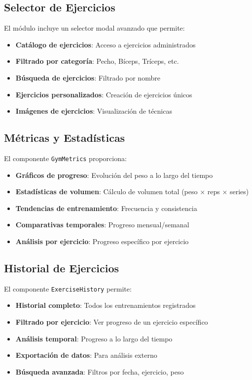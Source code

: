 \documentclass[12pt,a4paper]{article}
\begin{document}
\subsection{Selector de Ejercicios}

El módulo incluye un selector modal avanzado que permite:

\begin{itemize}
    \item \textbf{Catálogo de ejercicios}: Acceso a ejercicios administrados
    \item \textbf{Filtrado por categoría}: Pecho, Bíceps, Tríceps, etc.
    \item \textbf{Búsqueda de ejercicios}: Filtrado por nombre
    \item \textbf{Ejercicios personalizados}: Creación de ejercicios únicos
    \item \textbf{Imágenes de ejercicios}: Visualización de técnicas
\end{itemize}

\subsection{Métricas y Estadísticas}

El componente \texttt{GymMetrics} proporciona:

\begin{itemize}
    \item \textbf{Gráficos de progreso}: Evolución del peso a lo largo del tiempo
    \item \textbf{Estadísticas de volumen}: Cálculo de volumen total (peso × reps × series)
    \item \textbf{Tendencias de entrenamiento}: Frecuencia y consistencia
    \item \textbf{Comparativas temporales}: Progreso mensual/semanal
    \item \textbf{Análisis por ejercicio}: Progreso específico por ejercicio
\end{itemize}

\subsection{Historial de Ejercicios}

El componente \texttt{ExerciseHistory} permite:

\begin{itemize}
    \item \textbf{Historial completo}: Todos los entrenamientos registrados
    \item \textbf{Filtrado por ejercicio}: Ver progreso de un ejercicio específico
    \item \textbf{Análisis temporal}: Progreso a lo largo del tiempo
    \item \textbf{Exportación de datos}: Para análisis externo
    \item \textbf{Búsqueda avanzada}: Filtros por fecha, ejercicio, peso
\end{itemize}
\end{document}
